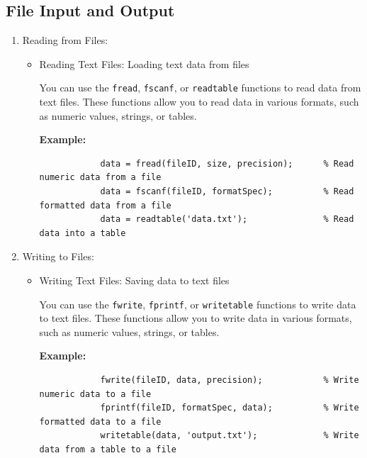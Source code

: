 \documentclass[
11pt, %
a4paper, %
oneside, %
headinclude,footinclude, %
BCOR5mm, %
]{scrartcl}
\begin{document}
\subsection{File Input and Output}
\begin{enumerate}
	\item Reading from Files:
	\begin{itemize}
		\item Reading Text Files: Loading text data from files
		
		You can use the \texttt{fread}, \texttt{fscanf}, or \texttt{readtable} functions to read data from text files. These functions allow you to read data in various formats, such as numeric values, strings, or tables.
		
		\textbf{Example:}
		\begin{verbatim}
			data = fread(fileID, size, precision);      % Read numeric data from a file
			data = fscanf(fileID, formatSpec);          % Read formatted data from a file
			data = readtable('data.txt');               % Read data into a table
		\end{verbatim}
	\end{itemize}
	
	\item Writing to Files:
	\begin{itemize}
		\item Writing Text Files: Saving data to text files
		
		You can use the \texttt{fwrite}, \texttt{fprintf}, or \texttt{writetable} functions to write data to text files. These functions allow you to write data in various formats, such as numeric values, strings, or tables.
		
		\textbf{Example:}
		\begin{verbatim}
			fwrite(fileID, data, precision);            % Write numeric data to a file
			fprintf(fileID, formatSpec, data);          % Write formatted data to a file
			writetable(data, 'output.txt');             % Write data from a table to a file
		\end{verbatim}
	\end{itemize}
\end{enumerate}
\end{document}
